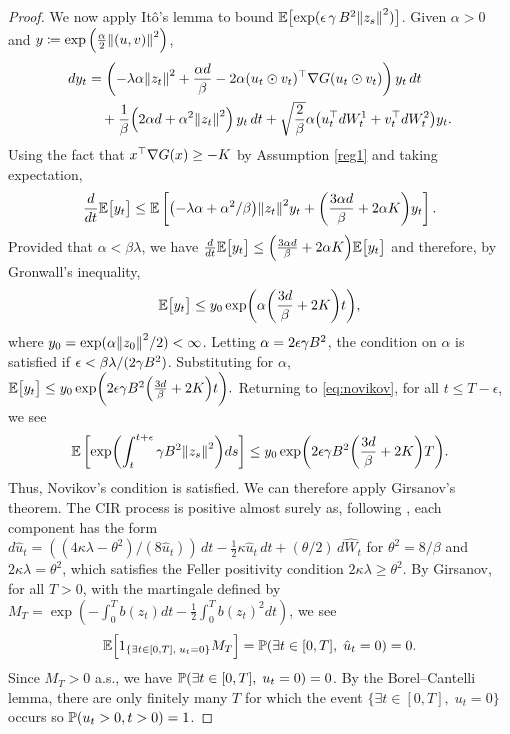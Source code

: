 \documentclass[11pt, twoside]{report}
\begin{document}
\begin{proof}
We now apply It\^o's lemma to bound $\EE \bigl[ \exp(\epsilon\, \gamma\, \cinfty^2 \norm{z_s}^2 ) \bigr]$. 
Given  $\alpha>0$ and  $y \eqdef\exp\left(\frac{\alpha}{2}\norm{(u,v)}^2 \right)$,  
\begin{align*}
    dy_t &= \pa{-\lambda \alpha \norm{z_t}^2 + \frac{\alpha d}{\beta} - 2\alpha (u_t\odot v_t)^\top \nabla G(u_t\odot v_t)} \,y_t\, dt\\
    &\quad + \frac{1}{\beta}\pa{2\alpha d + \alpha^2 \norm{z_t}^2}\, y_t\, dt + \sqrt{\frac{2}{\beta}} \alpha \pa{u_t^\top dW^1_t + v_t^\top dW^2_t} y_t.
\end{align*}
Using the fact that $x^\top \nabla G(x) \geq -K$ by Assumption \ref{reg1} and taking expectation,
$$
\frac{d}{dt}\EE\bigl[y_t\bigr] \leq \EE\left[\pa{-\lambda \alpha + \alpha^2/\beta}\norm{z_t}^2 y_t + \pa{\frac{3\alpha d}{\beta}  + 2\alpha \ccc} y_t\right].
$$
Provided that $ \alpha<\beta \lambda $, we have $\frac{d}{dt}\EE\bigl[y_t\bigr] \leq  \pa{\frac{3\alpha d}{\beta}  + 2\alpha \ccc} \EE\bigl[y_t\bigr]$ and therefore, by Gronwall's inequality,
$$
\EE\bigl[y_t\bigr]  \leq y_0 \exp\biggl( \alpha \pa{\frac{3 d}{\beta}  + 2 \ccc} t\biggr),
$$
where $y_0=\exp(\alpha \norm{z_0}^2/2)<\infty$. 
Letting $\alpha = 2\epsilon \gamma B^2 $, the condition on $\alpha$ is satisfied if $\epsilon  <\beta\lambda/(2\gamma B^2)$. Substituting for $\alpha$,
$
\EE\bigl[y_t\bigr]  \leq y_0 \exp\biggl(2\epsilon \gamma \cinfty^2  \pa{\frac{3 d}{\beta}  + 2 \ccc} t\biggr).
$
Returning to \eqref{eq:novikov}, for all $t\leq T-\epsilon$, we see
$$
\EE\left[ \exp\pa{\int_t^{t+\epsilon} \gamma \cinfty^2 \norm{z_s}^2} ds \right] \leq y_0\exp\biggl( 2\epsilon \gamma \cinfty^2  \pa{\frac{3 d}{\beta}  + 2 \ccc} T\biggr).
$$
Thus, Novikov's condition is satisfied. We can therefore apply Girsanov's theorem. The CIR process is positive almost surely as, following \cite{Dereich2011-tp}, each component has the form $d\hat u_t = ((4\kappa \lambda - \theta^2)/(8\hat u_t))\,dt - \frac12 \kappa \hat u_t\, dt + (\theta/2)\,d\hat W_t$ for $\theta^2 = 8/\beta$ and $2\kappa\lambda = \theta^2$, which satisfies the Feller positivity condition $2\kappa\lambda\geq \theta^2$.
By Girsanov, for all $T>0$, with the martingale defined by $M_T = \exp(-\int_0^T b(z_t) dt - \frac12 \int_0^T b(z_t)^2 dt)$, we see
$$
\mathbb{E}\Bigl[1_{\{\exists t\in [0,T], \; u_t=0\}} M_T\Bigr] =\mathbb{P}(\exists t\in [0,T], \;\hat u_t =0) =0.
$$
Since $M_T>0$ a.s., we have $\mathbb{P}(\exists t\in [0,T], \; u_t=0) = 0$.
By the Borel--Cantelli lemma, there are only finitely many $T$ for which the event $\{\exists t\in [0,T],\; u_t=0\}$ occurs so $\mathbb{P}(u_t>0, t>0) = 1$. 
\end{proof}
\end{document}

